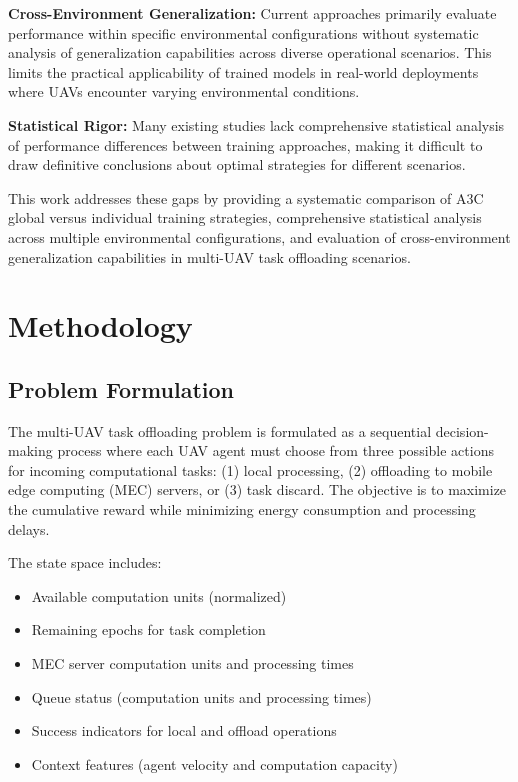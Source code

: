 \documentclass[journal]{IEEEtran}
\begin{document}
\textbf{Cross-Environment Generalization:} Current approaches primarily evaluate performance within specific environmental configurations without systematic analysis of generalization capabilities across diverse operational scenarios. This limits the practical applicability of trained models in real-world deployments where UAVs encounter varying environmental conditions.

\textbf{Statistical Rigor:} Many existing studies lack comprehensive statistical analysis of performance differences between training approaches, making it difficult to draw definitive conclusions about optimal strategies for different scenarios.

This work addresses these gaps by providing a systematic comparison of A3C global versus individual training strategies, comprehensive statistical analysis across multiple environmental configurations, and evaluation of cross-environment generalization capabilities in multi-UAV task offloading scenarios.

\section{Methodology}
\label{sec:methodology}

\subsection{Problem Formulation}

The multi-UAV task offloading problem is formulated as a sequential decision-making process where each UAV agent must choose from three possible actions for incoming computational tasks: (1) local processing, (2) offloading to mobile edge computing (MEC) servers, or (3) task discard. The objective is to maximize the cumulative reward while minimizing energy consumption and processing delays.

The state space includes:
\begin{itemize}
\item Available computation units (normalized)
\item Remaining epochs for task completion
\item MEC server computation units and processing times
\item Queue status (computation units and processing times)
\item Success indicators for local and offload operations
\item Context features (agent velocity and computation capacity)
\end{itemize}
\end{document}
